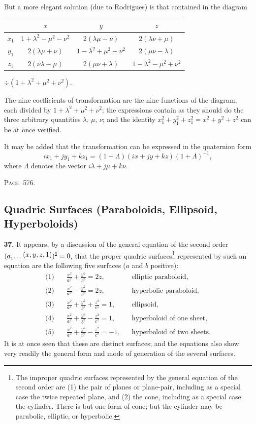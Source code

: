 \documentclass[11pt,a4paper]{book}
\begin{document}
But a more elegant solution (due to Rodrigues) is that contained in the diagram
\begin{center}
\begin{tabular}{c|ccc}
& $x$ & $y$ & $z$ \\
\hline
$x_1$ & $1+\lambda^2-\mu^2-\nu^2$ & $2(\lambda\mu-\nu)$ & $2(\lambda\nu+\mu)$ \\
$y_1$ & $2(\lambda\mu+\nu)$ & $1-\lambda^2+\mu^2-\nu^2$ & $2(\mu\nu-\lambda)$ \\
$z_1$ & $2(\nu\lambda-\mu)$ & $2(\mu\nu+\lambda)$ & $1-\lambda^2-\mu^2+\nu^2$ \\
\end{tabular}
\end{center}
$\div(1+\lambda^2+\mu^2+\nu^2)$.

The nine coefficients of transformation are the nine functions of the diagram, each divided by $1+\lambda^2+\mu^2+\nu^2$; the expressions contain as they should do the three arbitrary quantities $\lambda$, $\mu$, $\nu$; and the identity $x_1^2+y_1^2+z_1^2=x^2+y^2+z^2$ can be at once verified.

It may be added that the transformation can be expressed in the quaternion form
\[
ix_1+jy_1+kz_1=(1+\Lambda)(ix+jy+kz)(1+\Lambda)^{-1},
\]
where $\Lambda$ denotes the vector $i\lambda+j\mu+k\nu$.

\newpage
\noindent\textsc{Page~576.} \subsection*{Quadric Surfaces (Paraboloids, Ellipsoid, Hyperboloids)}

\textbf{37.} It appears, by a discussion of the general equation of the second order $(a,\ldots\,\raisebox{0.5ex}{\text{$\!(x,y,z,1)$}})^2=0$, that the proper quadric surfaces\footnote{The improper quadric surfaces represented by the general equation of the second order are (1) the pair of planes or plane-pair, including as a special case the twice repeated plane, and (2) the cone, including as a special case the cylinder. There is but one form of cone; but the cylinder may be parabolic, elliptic, or hyperbolic.} represented by such an equation are the following five surfaces ($a$ and $b$ positive):
\begin{align*}
\text{(1)}\quad &\frac{x^2}{a^2}+\frac{y^2}{b^2}=2z, && \text{elliptic paraboloid,}\\
\text{(2)}\quad &\frac{x^2}{a^2}-\frac{y^2}{b^2}=2z, && \text{hyperbolic paraboloid,}\\
\text{(3)}\quad &\frac{x^2}{a^2}+\frac{y^2}{b^2}+\frac{z^2}{c^2}=1, && \text{ellipsoid,}\\
\text{(4)}\quad &\frac{x^2}{a^2}+\frac{y^2}{b^2}-\frac{z^2}{c^2}=1, && \text{hyperboloid of one sheet,}\\
\text{(5)}\quad &\frac{x^2}{a^2}+\frac{y^2}{b^2}-\frac{z^2}{c^2}=-1, && \text{hyperboloid of two sheets.}
\end{align*}
It is at once seen that these are distinct surfaces; and the equations also show very readily the general form and mode of generation of the several surfaces.
\end{document}

